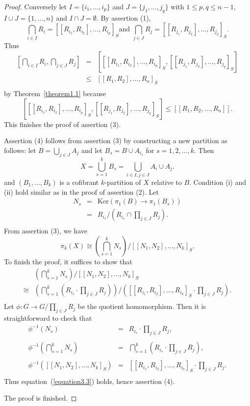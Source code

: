 \documentclass[10pt]{amsart}
\numberwithin{equation}{section}
\begin{document}
\begin{proof}
Conversely let $I=\{i_1,\ldots,i_p\}$ and $J=\{j_1,\ldots,j_q\}$ with $1\leq p,q\leq n-1$, $I\cup J=\{1,\ldots,n\}$ and $I\cap J=\emptyset$. By assertion (1),
$$
\bigcap_{i\in I}R_i=[[R_{i_1},R_{i_2}],\ldots,R_{i_p}]_S
\textrm{
and }
\bigcap_{j\in J}R_j=[[R_{j_1},R_{j_2}],\ldots,R_{j_q}]_S.
$$
Thus
$$
\begin{array}{rcl}
\left[\bigcap_{i\in I}R_i,\bigcap_{j\in J}R_j\right]&=&\left[ [[R_{i_1},R_{i_2}],\ldots,R_{i_p}]_S,[[R_{j_1},R_{j_2}],\ldots,R_{j_q}]_S\right]\\
&\leq&[[R_1,R_2],\ldots,R_n]_S\\
\end{array}
$$
by Theorem~\ref{theorem1.1} because
$$
\left[ [[R_{i_1},R_{i_2}],\ldots,R_{i_p}]_S,[[R_{j_1},R_{j_2}],\ldots,R_{j_q}]_S\right]\leq [[R_1,R_2,\ldots,R_n]].
$$
This finishes the proof of assertion (3).

Assertion (4) follows from assertion (3) by constructing a new partition as follows: let $B=\bigcup_{j\in J}A_j$ and let $B_s=B\cup A_{i_s}$ for $s=1,2,\ldots,k$. Then
$$
X=\bigcup_{s=1}^kB_s=\bigcup_{i\in I, j\in J}A_i\cup A_j.
$$
and $(B_1,\ldots,B_k)$ is a cofibrant $k$-partition of $X$ relative to $B$. Condition (i) and (ii) hold similar as in the proof of assertion (2).  Let
$$
\begin{array}{rcl}
N_s&=&{\mathrm{K er}}(\pi_1(B)\to \pi_1(B_s))\\
&=&R_{i_s}/(R_{i_s}\cap \prod_{j\in J}R_j).\\
\end{array}
$$
From assertion (3), we have $$
\pi_k(X)\cong \left(\bigcap_{s=1}^kN_s\right)/[[N_{1}, N_2],\ldots,N_k]_S.
$$
To finish the proof, it suffices to show that
\begin{equation}\label{equation3.3}
\begin{array}{rl}
 &\left(\bigcap_{s=1}^kN_s\right)/[[N_{1}, N_2],\ldots,N_k]_S\\
 \cong &(\bigcap_{s=1}^k(R_{i_s}\cdot \prod_{j\in J}R_j))/([[R_{i_1}, R_{i_2}],\ldots,R_{i_k}]_S\cdot \prod_{j\in J}R_j ).\\
 \end{array}
\end{equation}
Let $\phi\colon G\longrightarrow G/\prod_{j\in J}R_j$ be the quotient homomorphism. Then it is straightforward to check that
$$
\begin{array}{rcl}
\phi^{-1}(N_s)&=&R_{i_s}\cdot \prod_{j\in J}R_j,\\
&&\\
\phi^{-1}\left(\bigcap_{s=1}^kN_s\right)&=& \bigcap_{s=1}^k(R_{i_s}\cdot \prod_{j\in J}R_j),\\
&&\\
\phi^{-1}([[N_{1}, N_2],\ldots,N_k]_S)&=&[[R_{i_1}, R_{i_2}],\ldots,R_{i_k}]_S\cdot \prod_{j\in J}R_j.\\
\end{array}
$$
Thus equation~(\ref{equation3.3}) holds, hence assertion (4).

The proof is finished.
\end{proof}
\end{document}
